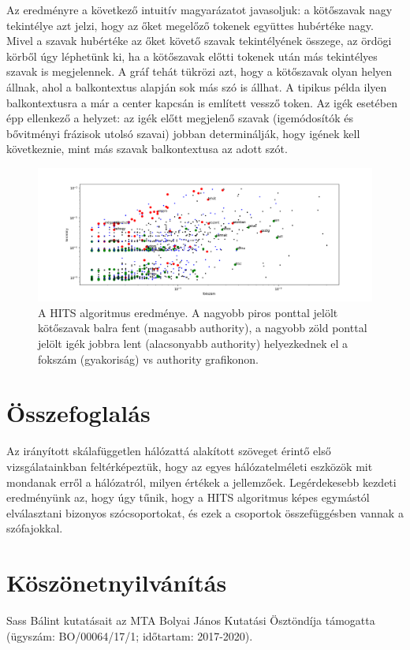 \documentclass{llncs}
\begin{document}
Az eredményre a következő intuitív magyarázatot javasoljuk: a kötőszavak nagy
tekintélye azt jelzi, hogy az őket megelőző tokenek együttes hubértéke nagy.
Mivel a szavak hubértéke az őket követő szavak tekintélyének összege, az ördögi
körből úgy léphetünk ki, ha a kötőszavak előtti tokenek után más tekintélyes
szavak is megjelennek. A gráf tehát tükrözi azt, hogy a kötőszavak olyan helyen
állnak, ahol a balkontextus alapján sok más szó is állhat. A tipikus példa
ilyen balkontextusra a már a center kapcsán is említett vessző token.
Az igék esetében épp ellenkező a helyzet: az igék előtt megjelenő szavak
(igemódosítók és bővitményi frázisok utolsó szavai) jobban determinálják, hogy
igének kell következnie, mint más szavak balkontextusa az adott szót.

\begin{figure}
\begin{center}
\includegraphics[width=25cm]{conj-verb-auth.png}
\caption{A HITS algoritmus eredménye.
A nagyobb piros ponttal jelölt kötőszavak balra fent
(magasabb authority),
a nagyobb zöld ponttal jelölt igék jobbra lent
(alacsonyabb authority)
helyezkednek el
a fokszám (gyakoriság) vs authority grafikonon.}
\end{center}
\label{fig:hits-auth}
\end{figure}


\section{Összefoglalás}

Az irányított skálafüggetlen hálózattá alakított szöveget
érintő első vizsgálatainkban feltérképeztük,
hogy az egyes hálózatelméleti eszközök
mit mondanak erről a hálózatról, milyen értékek a jellemzőek.
%
Legérdekesebb kezdeti eredményünk az,
hogy úgy tűnik, hogy a HITS algoritmus
képes egymástól elválasztani bizonyos szócsoportokat,
és ezek a csoportok összefüggésben vannak a szófajokkal.



\section*{Köszönetnyilvánítás}
\label{Koszonet}

Sass Bálint kutatásait
az MTA Bolyai János Kutatási Ösztöndíja támogatta
(ügyszám: BO/00064/17/1; időtartam: 2017-2020).


%


\end{document}
